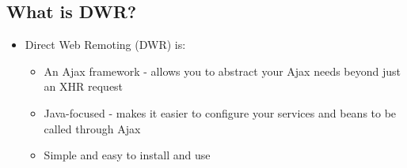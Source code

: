 \begin{ifhtml}
    \begin{s5slide}
        \section{What is DWR?}
            \begin{itemize}
                \item Direct Web Remoting (DWR) is:
                \begin{itemize}
                    \item An Ajax framework - allows you to abstract your Ajax needs beyond just an XHR request
                    \item Java-focused - makes it easier to configure your services and beans to be called through Ajax
                    \item Simple and easy to install and use
                \end{itemize}
            \end{itemize}
    \end{s5slide}
    \begin{s5slide}

\end{s5slide}
\end{ifhtml}
